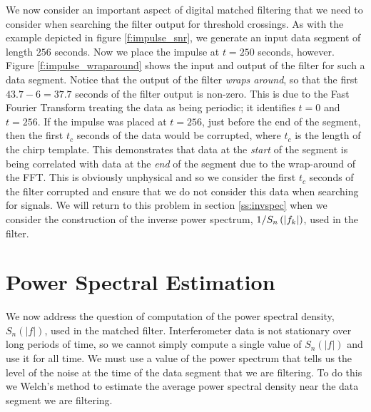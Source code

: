 We now consider an important aspect of digital matched filtering that we need
to consider when searching the filter output for threshold crossings. As with
the example depicted in figure \ref{f:impulse_snr}, we generate an input data
segment of length  $256$ seconds. Now we place the impulse at $t = 250$
seconds, however. Figure \ref{f:impulse_wraparound} shows the input and output
of the filter for such a data segment. Notice that the output of the filter
\emph{wraps around}, so that the first $43.7-6 = 37.7$ seconds of the filter
output is non-zero. This is due to the Fast Fourier Transform  treating the
data as being periodic; it identifies $t=0$ and $t=256$. If the impulse was
placed at $t=256$, just before the end of the segment, then the first $t_c$
seconds of the data would be corrupted, where $t_c$ is the length of the chirp
template. This demonstrates that data at the \emph{start} of the segment is
being correlated with data at the \emph{end} of the segment due to the
wrap-around of the FFT. This is obviously unphysical and so we consider the
first $t_c$ seconds of the filter corrupted and ensure that we do not consider
this data when searching for signals. We will return to this problem in
section \ref{ss:invspec} when we consider the construction of the inverse
power spectrum, $1/S_n\left(\left|f_{k}\right|\right)$, used in the filter.

\section{Power Spectral Estimation}
\label{ss:psd}

We now address the question of computation of the power spectral density,
$S_n(|f|)$, used in the matched filter. Interferometer data is not stationary
over long periods of time, so we cannot simply compute a single value of
$S_n(|f|)$ and use it for all time. We must use a value of the power spectrum
that tells us the level of the noise at the time of the data segment that we
are filtering. To do this we Welch's method\cite{Welch:1967} to estimate the
average power spectral density near the data segment we are filtering.

